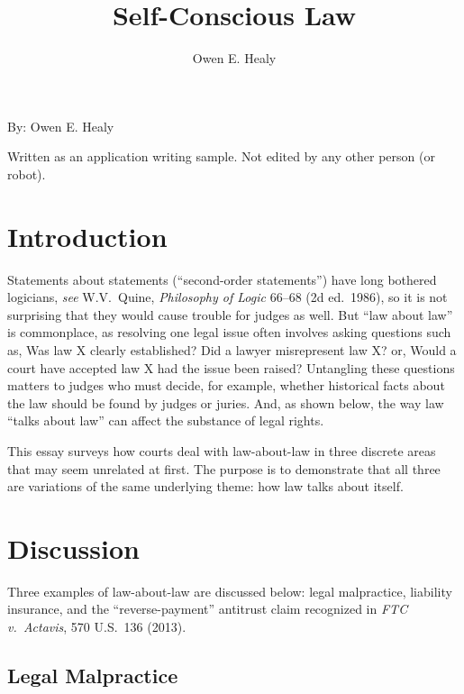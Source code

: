 \documentclass[
  12pt,
  letterpaper,
]{scrartcl}
\title{Self-Conscious Law}
\author{Owen E. Healy}
\begin{document}
\begin{center}\end{center}
  
\vspace{12pt}\noindent\begin{minipage}{4in}
  \setlength{\parskip}{6pt}
  
  \noindent By: Owen E. Healy

  \noindent Written as an application writing sample. Not edited by any other person (or robot).
\end{minipage}


\vspace{12pt}\section{Introduction}

Statements about statements (``second-order statements'') have long bothered
logicians, \textit{see} W.V.~Quine, \textit{Philosophy of Logic} 66--68 (2d
ed.~1986), so it is not surprising that they would cause trouble for judges as
well. But ``law about law'' is commonplace, as resolving one legal issue often
involves asking questions such as, Was law X clearly established? Did a lawyer
misrepresent law X? or, Would a court have accepted law X had the issue been
raised? Untangling these questions matters to judges who must decide, for
example, whether historical facts about the law should be found by judges or
juries. And, as shown below, the way law ``talks about law'' can affect the
substance of legal rights.

This essay surveys how courts deal with law-about-law in three discrete areas
that may seem unrelated at first. The purpose is to demonstrate that all three
are variations of the same underlying theme: how law talks about itself.


\section{Discussion}

Three examples of law-about-law are discussed below: legal malpractice,
liability insurance, and the ``reverse-payment'' antitrust claim recognized
in \textit{FTC v.~Actavis}, 570 U.S.~136 (2013).


\subsection{Legal Malpractice}
\end{document}
